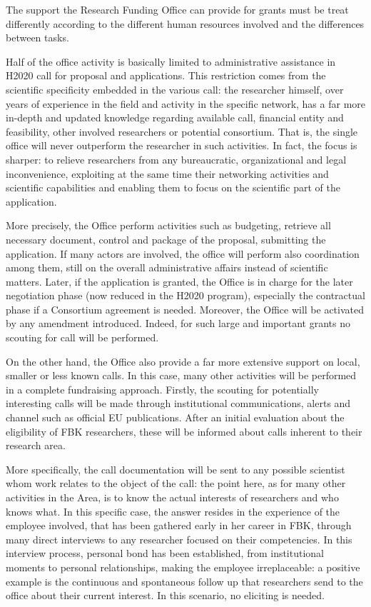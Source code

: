 The support the Research Funding Office can provide for grants must be treat differently according to the different human resources involved and the differences between tasks.

Half of the office activity is basically limited to administrative assistance in H2020 call for proposal and applications. This restriction comes from the scientific specificity embedded in the various call: the researcher himself, over years of experience in the field and activity in the specific network, has a far more in-depth and updated knowledge regarding available call, financial entity and feasibility, other involved researchers or potential consortium. That is, the single office will never outperform the researcher in such activities. In fact, the focus is sharper: to relieve researchers from any bureaucratic, organizational and legal inconvenience, exploiting at the same time their networking activities and scientific capabilities and enabling them to focus on the scientific part of the application.

More precisely, the Office perform activities such as budgeting, retrieve all necessary document, control and package of the proposal, submitting the application. If many actors are involved, the office will perform also coordination among them, still on the overall administrative affairs instead of scientific matters. Later, if the application is granted, the Office is in charge for the later negotiation phase (now reduced in the H2020 program), especially the contractual phase if a Consortium agreement is needed. Moreover, the Office will be activated by any amendment introduced. Indeed, for such large and important grants no scouting for call will be performed. 

On the other hand, the Office also provide a far more extensive support on local, smaller or less known calls. In this case, many other activities will be performed in a complete fundraising approach. Firstly, the scouting for potentially interesting calls will be made through institutional communications, alerts and channel such as official EU publications. After an initial evaluation about the eligibility of FBK researchers, these will be informed about calls inherent to their research area. 

More specifically, the call documentation will be sent to any possible scientist whom work relates to the object of the call: the point here, as for many other activities in the Area, is to know the actual interests of researchers and who knows what. In this specific case, the answer resides in the experience of the employee involved, that has been gathered early in her career in FBK, through many direct interviews to any researcher focused on their competencies. In this interview process, personal bond has been established, from institutional moments to personal relationships, making the employee irreplaceable: a positive example is the continuous and spontaneous follow up that researchers send to the office about their current interest. In this scenario, no eliciting is needed.

